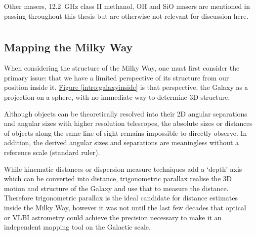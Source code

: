 			Other masers, 12.2~GHz class II methanol, OH and SiO masers are mentioned in passing throughout this thesis but are otherwise not relevant for discussion here.

	\section{\spirals} 
		\subsection{Mapping the Milky Way}
		    When considering the structure of the Milky Way, one must first consider the primary issue: that we have a limited perspective of its structure from our position inside it. \hyperref[intro:galaxyinside]{Figure \ref*{intro:galaxyinside}} is that perspective, the Galaxy as a projection on a sphere, with no immediate way to determine 3D structure.

		    Although objects can be theoretically resolved into their 2D angular separations and angular sizes with higher resolution telescopes, the absolute sizes or distances of objects along the same line of sight remains impossible to directly observe. In addition, the derived angular sizes and separations are meaningless without a reference scale (standard ruler). 

		    
		    While kinematic distances or dispersion measure techniques add a `depth' axis which can be converted into distance, trigonometric parallax realise the 3D motion and structure of the Galaxy and use that to measure the distance. Therefore trigonometric parallax is the ideal candidate for distance estimates inside the Milky Way, however it was not until the last few decades that optical or VLBI astrometry could achieve the precision necessary to make it an independent mapping tool on the Galactic scale. 
		     
